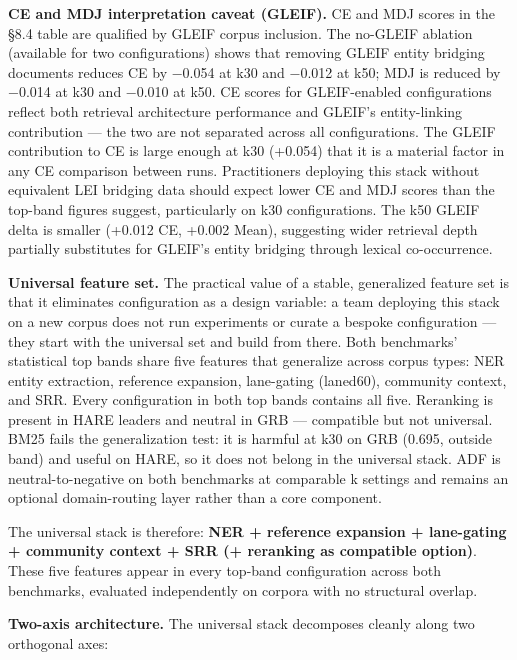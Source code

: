 \documentclass[
]{article}
\begin{document}
\textbf{CE and MDJ interpretation caveat (GLEIF).} CE and MDJ scores in
the §8.4 table are qualified by GLEIF corpus inclusion. The no-GLEIF
ablation (available for two configurations) shows that removing GLEIF
entity bridging documents reduces CE by −0.054 at k30 and −0.012 at k50;
MDJ is reduced by −0.014 at k30 and −0.010 at k50. CE scores for
GLEIF-enabled configurations reflect both retrieval architecture
performance and GLEIF's entity-linking contribution --- the two are not
separated across all configurations. The GLEIF contribution to CE is
large enough at k30 (+0.054) that it is a material factor in any CE
comparison between runs. Practitioners deploying this stack without
equivalent LEI bridging data should expect lower CE and MDJ scores than
the top-band figures suggest, particularly on k30 configurations. The
k50 GLEIF delta is smaller (+0.012 CE, +0.002 Mean), suggesting wider
retrieval depth partially substitutes for GLEIF's entity bridging
through lexical co-occurrence.

\textbf{Universal feature set.} The practical value of a stable,
generalized feature set is that it eliminates configuration as a design
variable: a team deploying this stack on a new corpus does not run
experiments or curate a bespoke configuration --- they start with the
universal set and build from there. Both benchmarks' statistical top
bands share five features that generalize across corpus types: NER
entity extraction, reference expansion, lane-gating (laned60), community
context, and SRR. Every configuration in both top bands contains all
five. Reranking is present in HARE leaders and neutral in GRB ---
compatible but not universal. BM25 fails the generalization test: it is
harmful at k30 on GRB (0.695, outside band) and useful on HARE, so it
does not belong in the universal stack. ADF is neutral-to-negative on
both benchmarks at comparable k settings and remains an optional
domain-routing layer rather than a core component.

The universal stack is therefore: \textbf{NER + reference expansion +
lane-gating + community context + SRR (+ reranking as compatible
option)}. These five features appear in every top-band configuration
across both benchmarks, evaluated independently on corpora with no
structural overlap.

\textbf{Two-axis architecture.} The universal stack decomposes cleanly
along two orthogonal axes:
\end{document}
